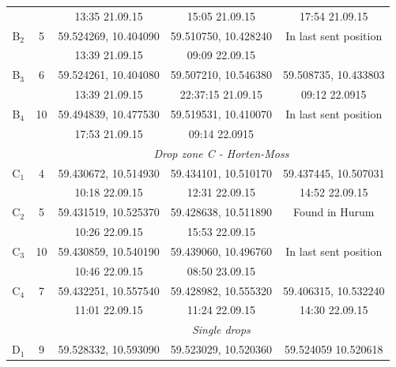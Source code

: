 \documentclass[12pt,a4paper,english]{article}
\begin{document}
\begin{table}[tb]
\begin{tabular}{|c|c|ccc|}
             &         & 13:35 21.09.15       & 15:05 21.09.15          & 17:54 21.09.15             \\
        B$_2$& 5       & 59.524269, 10.404090 & 59.510750, 10.428240    & In last sent position     \\
             &         & 13:39 21.09.15       & 09:09 22.09.15          &                            \\
        B$_3$& 6       & 59.524261, 10.404080 & 59.507210, 10.546380    & 59.508735, 10.433803       \\
             &         & 13:39 21.09.15       & 22:37:15 21.09.15       & 09:12 22.0915              \\
        B$_4$& 10      & 59.494839, 10.477530 & 59.519531, 10.410070    & In last sent position      \\
             &         & 17:53 21.09.15       & 09:14 22.0915           &                            \\ \hline 
             &         &          \multicolumn{3}{c|}{\textit{Drop zone C - Horten-Moss}}             \\
        C$_1$& 4       & 59.430672, 10.514930 & 59.434101, 10.510170    & 59.437445, 10.507031       \\
             &         & 10:18 22.09.15       & 12:31 22.09.15          & 14:52 22.09.15             \\
        C$_2$& 5       & 59.431519, 10.525370 & 59.428638, 10.511890    & Found in Hurum             \\
             &         & 10:26 22.09.15       & 15:53 22.09.15          &                            \\
        C$_3$& 10      & 59.430859, 10.540190 & 59.439060, 10.496760    & In last sent position      \\
             &         & 10:46 22.09.15	      & 08:50 23.09.15          &                            \\
        C$_4$& 7       & 59.432251, 10.557540 & 59.428982, 10.555320    & 59.406315, 10.532240       \\
             &         & 11:01 22.09.15       & 11:24 22.09.15          & 14:30 22.09.15             \\ \hline 
             &         &          \multicolumn{3}{c|}{\textit{Single drops}}                          \\
        D$_1$& 9       & 59.528332, 10.593090 & 59.523029, 10.520360    & 59.524059 10.520618        \\

\end{tabular}
\end{table}
\end{document}
